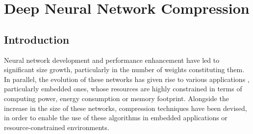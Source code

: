 \chapter{Deep Neural Network Compression}\label{chap:sota}

\localtableofcontents

\section{Introduction}\label{sec:sota:intro}

Neural network development and performance enhancement have led to significant
size growth, particularly in the number of weights constituting them. In
parallel, the evolution of these networks has given rise to various applications
\cite{DBLP:conf/nips/KrizhevskySH12,DBLP:conf/emnlp/BudzianowskiV19,silver2018general,jumper2021highly},
particularly embedded ones\cite{kim2020review,kuutti2020survey}, whose resources
are highly constrained in terms of computing power, energy consumption or memory
footprint. Alongside the increase in the size of these networks, compression
techniques have been devised, in order to enable the use of these algorithms in
embedded applications or resource-constrained environments.\\

